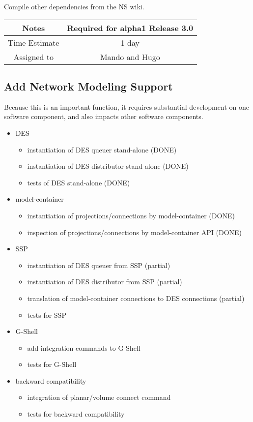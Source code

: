 \documentclass[12pt]{article}
\begin{document}
Compile other dependencies from the NS wiki.

{
  \vspace{5mm}
  \centering
  \begin{tabular}{|c|c|}
    \hline
    Notes
    & Required for alpha1 Release 3.0 \\
    \hline
    Time Estimate
    & 1 day \\
    \hline
    Assigned to
    & Mando and Hugo \\
    \hline
  \end{tabular}
}





\subsection{Add Network Modeling Support}

Because this is an important function, it requires substantial
development on one software component, and also impacts other software
components.

\begin{itemize}
\item DES
  \begin{itemize}
  \item instantiation of DES queuer stand-alone (DONE)
  \item instantiation of DES distributor stand-alone (DONE)
  \item tests of DES stand-alone (DONE)
  \end{itemize}
\item model-container
  \begin{itemize}
  \item instantiation of projections/connections by model-container (DONE)
  \item inspection of projections/connections by model-container API (DONE)
  \end{itemize}
\item SSP
  \begin{itemize}
  \item instantiation of DES queuer from SSP (partial)
  \item instantiation of DES distributor from SSP (partial)
  \item translation of model-container connections to DES connections (partial)
  \item tests for SSP
  \end{itemize}
\item G-Shell
  \begin{itemize}
  \item add integration commands to G-Shell
  \item tests for G-Shell
  \end{itemize}
\item backward compatibility
  \begin{itemize}
  \item integration of planar/volume connect command
  \item tests for backward compatibility
  \end{itemize}
\end{itemize}
\end{document}
